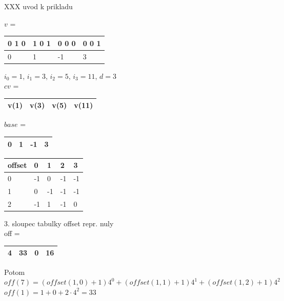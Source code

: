 \begin{priklad}
XXX uvod k prikladu

$v$ = 
\begin{tabular}{|l|l|l|l|}
\hline
0 1 0 & 1 0 1 & 0 0 0 & 0 0 1 \\
\hline
      0  &     1 &      -1 &    3 \\
\hline
\end{tabular}

\vspace{5mm}

$i_0 = 1$, $i_1 = 3$, $i_2 = 5$, $i_3 = 11$, $d = 3$ \\

$cv$ = 
\begin{tabular}{|l|l|l|l|}
\hline
v(1) & v(3) & v(5) & v(11) \\
\hline
\end{tabular}

\vspace{5mm}

$base$ =
\begin{tabular}{|l|l|l|l|}
\hline
0 & 1 & -1 & 3 \\
\hline
\end{tabular}

\vspace{5mm}

\begin{tabular}{|l|llll|}
\hline
offset & 0 & 1 & 2 & 3 \\
\hline
0 & -1 & 0 & -1 & -1 \\
1 & 0 & -1 & -1 & -1 \\
2 & -1 & 1 & -1 & 0 \\
\hline
\end{tabular}

\vspace{5mm}

3. sloupec tabulky offset repr. nuly \\
\noindent
off = 
\begin{tabular}{|l|l|l|l|}
\hline
4 & 33 & 0 & 16 \\
\hline
\end{tabular}

\vspace{5mm}

Potom
$off(7) = (offset(1,0) + 1)4^0 + (offset(1,1) + 1)4^1 + (offset(1,2) +
1)4^2$
$off(1) = 1 + 0 + 2\cdot4^2 = 33$

\end{priklad}
